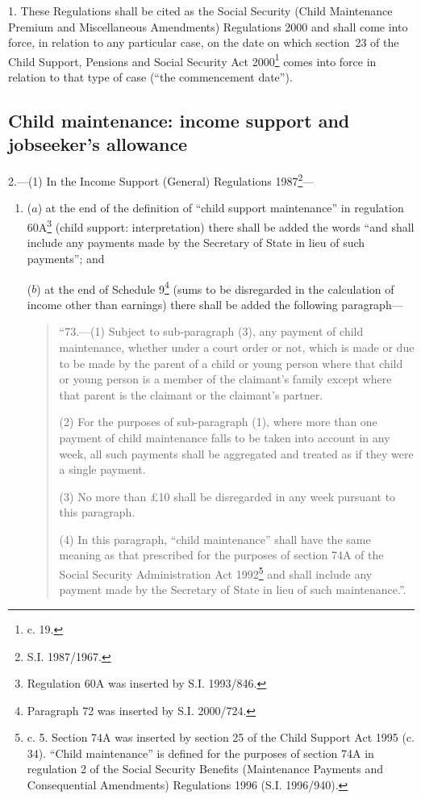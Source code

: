 \documentclass[12pt,a4paper]{article}
\begin{document}
1.  These Regulations shall be cited as the Social Security (Child Maintenance Premium and Miscellaneous Amendments) Regulations 2000 and shall come into force, in relation to any particular case, on the date on which section~23 of the Child Support, Pensions and Social Security Act 2000\footnote{ c. 19.} comes into force in relation to that type of case (“the commencement date”).

\subsection[2. Child maintenance: income support and jobseeker’s allowance]{\sloppy Child maintenance: income support and jobseeker’s allowance}

2.---(1)  In the Income Support (General) Regulations 1987\footnote{\frenchspacing S.I. 1987/1967.}—
\begin{enumerate}\item[]
($a$) at the end of the definition of “child support maintenance” in regulation 60A\footnote{\frenchspacing Regulation 60A was inserted by S.I. 1993/846.} (child support: interpretation) there shall be added the words “and shall include any payments made by the Secretary of State in lieu of such payments”; and

($b$) at the end of Schedule 9\footnote{\frenchspacing Paragraph 72 was inserted by S.I. 2000/724.} (sums to be disregarded in the calculation of income other than earnings) there shall be added the following paragraph—
\begin{quotation}
“73.---(1)  Subject to sub-paragraph (3), any payment of child maintenance, whether under a court order or not, which is made or due to be made by the parent of a child or young person where that child or young person is a member of the claimant’s family except where that parent is the claimant or the claimant’s partner.

(2) For the purposes of sub-paragraph (1), where more than one payment of child maintenance falls to be taken into account in any week, all such payments shall be aggregated and treated as if they were a single payment.

(3) No more than £10 shall be disregarded in any week pursuant to this paragraph.

(4) In this paragraph, “child maintenance” shall have the same meaning as that prescribed for the purposes of section 74A of the Social Security Administration Act 1992\footnote{ c. 5. Section 74A was inserted by section 25 of the Child Support Act 1995 (c. 34). “Child maintenance” is defined for the purposes of section 74A in regulation 2 of the Social Security Benefits (Maintenance Payments and Consequential Amendments) Regulations 1996 (S.I. 1996/940).} and shall include any payment made by the Secretary of State in lieu of such maintenance.”.
\end{quotation}
\end{enumerate}
\end{document}
